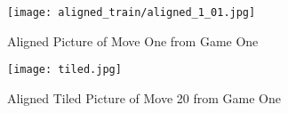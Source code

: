 \documentclass{article}
\begin{document}
\begin{figure}[hbt!]
	\centering
	\texttt{[image: aligned\_train/aligned\_1\_01.jpg]}
	\caption{Aligned Picture of Move One from Game One}
\end{figure}
\begin{figure}[hbt!]
	\centering
	\texttt{[image: tiled.jpg]}
	\caption{Aligned Tiled Picture of Move 20 from Game One}
\end{figure}
\end{document}
